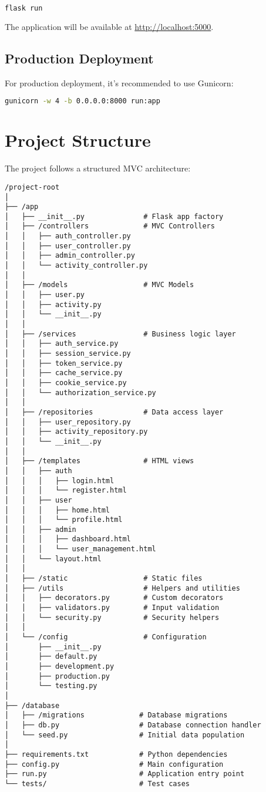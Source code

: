 \documentclass{article}
\begin{document}
\begin{lstlisting}[language=bash]
flask run
\end{lstlisting}

The application will be available at \url{http://localhost:5000}.

\subsection{Production Deployment}

For production deployment, it's recommended to use Gunicorn:

\begin{lstlisting}[language=bash]
gunicorn -w 4 -b 0.0.0.0:8000 run:app
\end{lstlisting}

\section{Project Structure}

The project follows a structured MVC architecture:

\begin{lstlisting}
/project-root
│
├── /app
│   ├── __init__.py              # Flask app factory
│   ├── /controllers             # MVC Controllers
│   │   ├── auth_controller.py
│   │   ├── user_controller.py
│   │   ├── admin_controller.py
│   │   └── activity_controller.py
│   │
│   ├── /models                  # MVC Models
│   │   ├── user.py
│   │   ├── activity.py
│   │   └── __init__.py
│   │
│   ├── /services                # Business logic layer
│   │   ├── auth_service.py
│   │   ├── session_service.py
│   │   ├── token_service.py
│   │   ├── cache_service.py
│   │   ├── cookie_service.py
│   │   └── authorization_service.py
│   │
│   ├── /repositories            # Data access layer
│   │   ├── user_repository.py
│   │   ├── activity_repository.py
│   │   └── __init__.py
│   │
│   ├── /templates               # HTML views
│   │   ├── auth
│   │   │   ├── login.html
│   │   │   └── register.html
│   │   ├── user
│   │   │   ├── home.html
│   │   │   └── profile.html
│   │   ├── admin
│   │   │   ├── dashboard.html
│   │   │   └── user_management.html
│   │   └── layout.html
│   │
│   ├── /static                  # Static files
│   ├── /utils                   # Helpers and utilities
│   │   ├── decorators.py        # Custom decorators
│   │   ├── validators.py        # Input validation
│   │   └── security.py          # Security helpers
│   │
│   └── /config                  # Configuration
│       ├── __init__.py
│       ├── default.py
│       ├── development.py
│       ├── production.py
│       └── testing.py
│
├── /database
│   ├── /migrations             # Database migrations
│   ├── db.py                   # Database connection handler
│   └── seed.py                 # Initial data population
│
├── requirements.txt            # Python dependencies
├── config.py                   # Main configuration
├── run.py                      # Application entry point
└── tests/                      # Test cases
\end{lstlisting}
\end{document}
